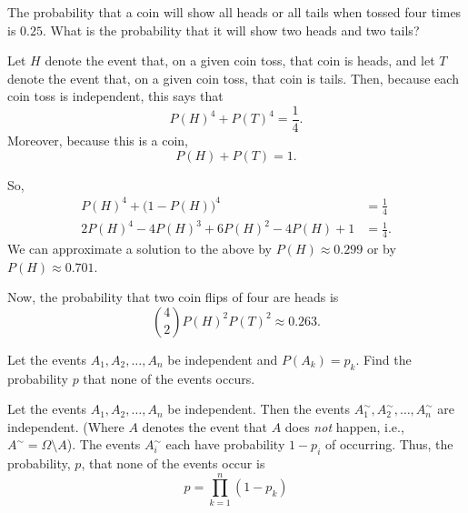 \begin{problem}[Handout 5, \# 12]
  The probability that a coin will show all heads or all tails when tossed
  four times is \(0.25\). What is the probability that it will show two
  heads and two tails?
\end{problem}
\begin{solution}
  Let $H$ denote the event that, on a given coin toss, that coin is heads,
  and let $T$ denote the event that, on a given coin toss, that coin is
  tails. Then, because each coin toss is independent, this says that
  \[
    P(H)^4 + P(T)^4 = \frac{1}{4}.
  \]
  Moreover, because this is a coin,
  \[
    P(H) + P(T) = 1.
  \]

  So,
  \begin{align*}
    P(H)^4 + \bigl(1-P(H)\bigr)^4 &= \frac{1}{4} \\
    2P(H)^4 -4P(H)^3 + 6P(H)^2 - 4P(H) +1 &= \frac{1}{4}.
  \end{align*}
  We can approximate a solution to the above by $P(H) \approx 0.299$ or by
  $P(H) \approx 0.701$.

  Now, the probability that two coin flips of four are heads is
  \[
    \binom{4}{2}P(H)^2P(T)^2 \approx 0.263.
  \]
\end{solution}
\newpage

\begin{problem}[Handout 5, \# 13]
  Let the events \(A_1, A_2,\dotsc,A_n\) be independent and
  \(P(A_k)=p_k\). Find the probability \(p\) that none of the events
  occurs.
\end{problem}
\begin{solution}
  Let the events $A_1, A_2,\dotsc, A_n$ be independent. Then the events
  $A_1^\sim, A_2^\sim, \dotsc, A_n^\sim$ are independent. (Where $A$
  denotes the event that $A$ does \emph{not} happen, i.e.,
  \(A^\sim=\Omega\setminus A\)). The events $A_i^\sim$ each have
  probability $1-p_i$ of occurring. Thus, the probability, $p$, that none
  of the events occur is
  \[
    p = \prod_{k=1}^n (1-p_k)
  \]
\end{solution}
\newpage

